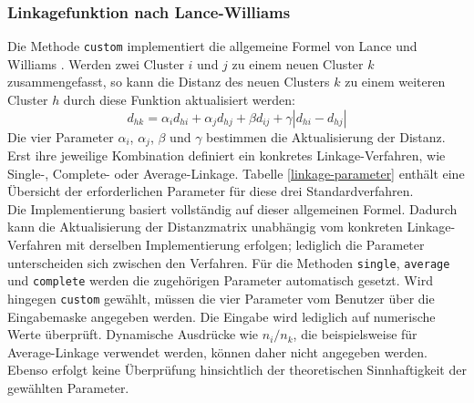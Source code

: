 \documentclass[12pt]{article}
\begin{document}
\subsubsection{Linkagefunktion nach Lance-Williams}
\label{lance-williams}
Die Methode \verb*|custom| implementiert die allgemeine Formel von Lance und Williams \cite{Lance1967a}. Werden zwei Cluster $i$ und $j$ zu einem neuen Cluster $k$ zusammengefasst, so kann die Distanz des neuen Clusters $k$ zu einem weiteren Cluster $h$ durch diese Funktion aktualisiert werden:
\[ d_{hk} = \alpha_i d_{hi} + \alpha_j d_{hj} + \beta d_{ij} + \gamma |d_{hi}-d_{hj}| \]
Die vier Parameter \(\alpha_i\), \(\alpha_j\), \(\beta\) und \(\gamma\) bestimmen die Aktualisierung der Distanz. Erst ihre jeweilige Kombination definiert ein konkretes Linkage-Verfahren, wie Single-, Complete- oder Average-Linkage. Tabelle \ref{linkage-parameter} enthält eine Übersicht der erforderlichen Parameter für diese drei Standardverfahren.\\
Die Implementierung basiert vollständig auf dieser allgemeinen Formel. Dadurch kann die Aktualisierung der Distanzmatrix unabhängig vom konkreten Linkage-Verfahren mit derselben Implementierung erfolgen; lediglich die Parameter unterscheiden sich zwischen den Verfahren. Für die Methoden \verb*|single|,  \verb*|average| und \verb*|complete| werden die zugehörigen Parameter automatisch gesetzt. Wird hingegen \verb*|custom| gewählt, müssen die vier Parameter vom Benutzer über die Eingabemaske angegeben werden. Die Eingabe wird lediglich auf numerische Werte überprüft. Dynamische Ausdrücke wie $n_i/n_k$, die beispielsweise für Average-Linkage verwendet werden, können daher nicht angegeben werden. Ebenso erfolgt keine Überprüfung hinsichtlich der theoretischen Sinnhaftigkeit der gewählten Parameter.
\end{document}

